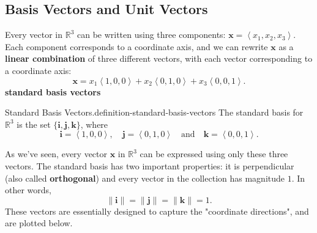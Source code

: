 \documentclass[10pt,]{book}
\newcommand{\terminology}[1]{\textbf{#1}}
\numberwithin{equation}{section}
\newcommand{\RR}{\mathbb{R}}
\newcommand{\vv}[1]{\mathbf{#1}}
\newcommand{\dotprod}[1]{\left\langle #1 \right\rangle}
\begin{document}
\subsection[{Basis Vectors and Unit Vectors}]{Basis Vectors and Unit Vectors}\label{subsection-basis-vectors-and-unit-vectors}
\hypertarget{p-1107}{}%
Every vector in \(\RR^{3}\) can be written using three components: \(\vv{x} = \dotprod{x_{1},x_{2},x_{3}}.\) Each component corresponds to a coordinate axis, and we can rewrite \(\vv{x}\) as a \terminology{linear combination} of three different vectors, with each vector corresponding to a coordinate axis:%
%
\begin{equation*}
\vv{x} = x_{1}\dotprod{1,0,0}+x_{2}\dotprod{0,1,0}+x_{3}\dotprod{0,0,1}.
\end{equation*}
\terminology{standard basis vectors}\begin{definition}{Standard Basis Vectors.}{definition-standard-basis-vectors}%
\hypertarget{p-1108}{}%
The standard basis for \(\RR^{3}\) is the set \(\{\vv{i},\vv{j},\vv{k}\}\), where%
%
\begin{equation*}
\vv{i} = \dotprod{1,0,0},\quad\vv{j} = \dotprod{0,1,0}\quad\text{and}\quad\vv{k} = \dotprod{0,0,1}.
\end{equation*}
\end{definition}
\hypertarget{p-1109}{}%
As we've seen, every vector \(\vv{x}\) in \(\RR^{3}\) can be expressed using only these three vectors. The standard basis has two important properties: it is perpendicular (also called \terminology{orthogonal}) and every vector in the collection has magnitude \(1\). In other words,%
%
\begin{equation*}
\|\vv{i}\| = \|\vv{j}\| = \|\vv{k}\| = 1.
\end{equation*}
\hypertarget{p-1110}{}%
These vectors are essentially designed to capture the "coordinate directions", and are plotted below.%
\end{document}
